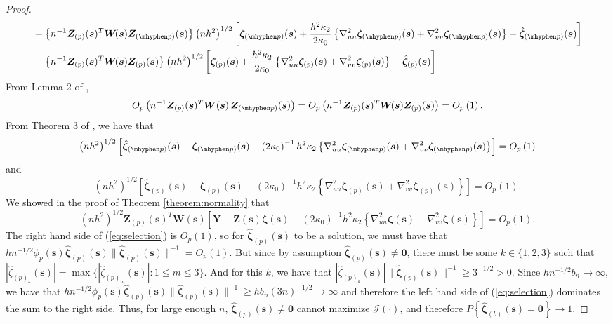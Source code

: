 \documentclass[authoryear,review, 12pt]{elsarticle}
\begin{document}
\begin{proof}
\begin{align}
 & +\left\{ n^{-1}\bm{Z}_{(p)}(\bm{s})^{T}\bm{W}\!(\bm{s})\bm{Z}_{(\mhyphen p)}(\bm{s})\right\} \left(nh^{2}\right)^{1/2}\left[\bm{\zeta}_{(\mhyphen p)}(\bm{s})+\frac{h^{2}\kappa_{2}}{2\kappa_{0}}\left\{ \nabla_{uu}^{2}\bm{\zeta}_{(\mhyphen p)}(\bm{s})+\nabla_{vv}^{2}\bm{\zeta}_{(\mhyphen p)}(\bm{s})\right\} -\hat{\bm{\zeta}}_{(\mhyphen p)}(\bm{s})\right]\nonumber \\
 & +\left\{ n^{-1}\bm{Z}_{(p)}(\bm{s})^{T}\bm{W}\!(\bm{s})\bm{Z}_{(p)}(\bm{s})\right\} \left(nh^{2}\right)^{1/2}\left[\bm{\zeta}_{(p)}(\bm{s})+\frac{h^{2}\kappa_{2}}{2\kappa_{0}}\left\{ \nabla_{uu}^{2}\bm{\zeta}_{(p)}(\bm{s})+\nabla_{vv}^{2}\bm{\zeta}_{(p)}(\bm{s})\right\} -\hat{\bm{\zeta}}_{(p)}(\bm{s})\right]\label{eq:selection}
\end{align}
From Lemma 2 of \citet{Sun-Yan-Zhang-Lu-2014}, 
\[
O_{p}\left(n^{-1}\bm{Z}_{(p)}(\bm{s})^{T}\bm{W}\!\left(\bm{s}\right)\bm{Z}_{(\mhyphen p)}(\bm{s})\right)=O_{p}\left(n^{-1}\bm{Z}_{(p)}(\bm{s})^{T}\bm{W}\!(\bm{s})\bm{Z}_{(p)}(\bm{s})\right)=O_{p}\left(1\right).
\]
From Theorem 3 of \citet{Sun-Yan-Zhang-Lu-2014}, we have that 
\[
\left(nh^{2}\right)^{1/2}\left[\hat{\bm{\zeta}}_{(\mhyphen p)}(\bm{s})-\bm{\zeta}_{(\mhyphen p)}(\bm{s})-\left(2\kappa_{0}\right)^{-1}h^{2}\kappa_{2}\left\{ \nabla_{uu}^{2}\bm{\zeta}_{(\mhyphen p)}(\bm{s})+\nabla_{vv}^{2}\bm{\zeta}_{(\mhyphen p)}(\bm{s})\right\} \right]=O_{p}\left(1\right)
\]
 and 
\[
\left(nh^{2}\right)^{1/2}\left[\hat{\bm{\zeta}}_{(p)}(\bm{s})-\bm{\zeta}_{(p)}(\bm{s})-\left(2\kappa_{0}\right)^{-1}h^{2}\kappa_{2}\left\{ \nabla_{uu}^{2}\bm{\zeta}_{(p)}(\bm{s})+\nabla_{vv}^{2}\bm{\zeta}_{(p)}(\bm{s})\right\} \right]=O_{p}\left(1\right).
\]
We showed in the proof of Theorem \ref{theorem:normality} that
\[
\left(nh^{2}\right)^{1/2}\bm{Z}_{(p)}(\bm{s})^{T}\bm{W}\!(\bm{s})\left[\bm{Y}-\bm{Z}\!(\bm{s})\bm{\zeta}(\bm{s})-\left(2\kappa_{0}\right)^{-1}h^{2}\kappa_{2}\left\{ \nabla_{uu}^{2}\bm{\zeta}(\bm{s})+\nabla_{vv}^{2}\bm{\zeta}(\bm{s})\right\} \right]=O_{p}\left(1\right).
\]
The right hand side of (\ref{eq:selection}) is $O_{p}(1)$, so for
$\hat{\bm{\zeta}}_{(p)}(\bm{s})$ to be a solution, we must have that
$hn^{-1/2}\phi_{p}(\bm{s})\hat{\bm{\zeta}}_{(p)}(\bm{s})\|\hat{\bm{\zeta}}_{(p)}(\bm{s})\|^{-1}=O_{p}\left(1\right)$.
But since by assumption $\hat{\bm{\zeta}}_{(p)}(\bm{s})\ne\bm{0}$,
there must be some $k\in\{1,2,3\}$ such that $|\hat{\zeta}_{(p)_{k}}(\bm{s})|=\max\{|\hat{\zeta}_{(p)_{m}}(\bm{s})|:1\le m\le3\}$.
And for this $k$, we have that $|\hat{\zeta}_{(p)_{k}}(\bm{s})|\|\hat{\bm{\zeta}}_{(p)}(\bm{s})\|^{-1}\ge3^{-1/2}>0$.
Since $hn^{-1/2}b_{n}\to\infty$, we have that $hn^{-1/2}\phi_{p}(\bm{s})\hat{\bm{\zeta}}_{(p)}(\bm{s})\|\hat{\bm{\zeta}}_{(p)}(\bm{s})\|^{-1}\ge hb_{n}\left(3n\right)^{-1/2}\to\infty$
and therefore the left hand side of (\ref{eq:selection}) dominates
the sum to the right side. Thus, for large enough $n$, $\hat{\bm{\zeta}}_{(p)}(\bm{s})\ne\bm{0}$
cannot maximize $\mathcal{J}\left(\cdot\right)$, and therefore $P\left\{ \hat{\bm{\zeta}}_{(b)}(\bm{s})=\bm{0}\right\} \to1$. 
\end{proof}
\end{document}

